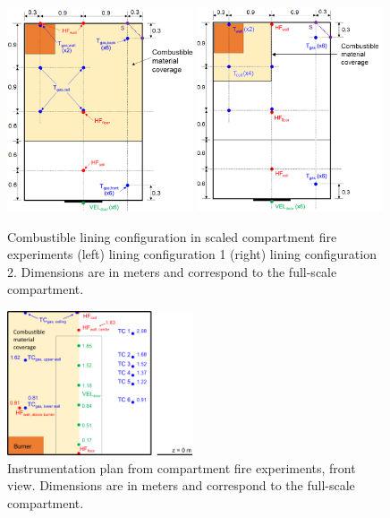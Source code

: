 \begin{figure}[h!]
\includegraphics[width=0.49\textwidth]{FIGURES/JH_FRA/JH_FRA_instrumentation3}
\includegraphics[width=0.49\textwidth]{FIGURES/JH_FRA/JH_FRA_instrumentation1} \\
\caption[Combustible lining configuration in scaled compartment fire experiments]{Combustible lining configuration in scaled compartment fire experiments (left) lining configuration 1 (right) lining configuration 2. Dimensions are in meters and correspond to the full-scale compartment.}
\label{JH_FRA_lining_fig}
\end{figure}

\begin{figure}[h!]
\includegraphics[width=0.49\textwidth]{FIGURES/JH_FRA/JH_FRA_instrumentation2}
\caption[Instrumentation plan from compartment fire experiments]{Instrumentation plan from compartment fire experiments, front view. Dimensions are in meters and correspond to the full-scale compartment.}
\label{JH_FRA_instrumentation_fig}
\end{figure}

